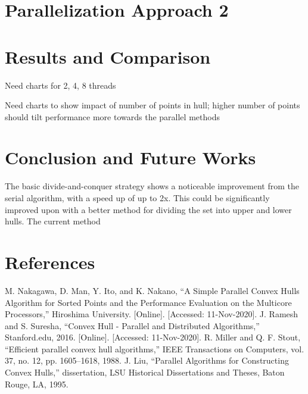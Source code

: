 \documentclass[conference]{IEEEtran}
\begin{document}
\section{Parallelization Approach 2}

\section{Results and Comparison}

Need charts for 2, 4, 8 threads

Need charts to show impact of number of points in hull; higher number of points should tilt performance more towards the parallel methods

\section{Conclusion and Future Works}
The basic divide-and-conquer strategy shows a noticeable improvement from the serial algorithm, with a speed up of up to 2x. This could be significantly improved upon with a better method for dividing the set into upper and lower hulls. The current method 

\section{References}
\begin{thebibliography}{00}
 M. Nakagawa, D. Man, Y. Ito, and K. Nakano, “A Simple Parallel Convex Hulls Algorithm for Sorted Points and the Performance Evaluation on the Multicore Processors,” Hiroshima University. [Online]. [Accessed: 11-Nov-2020].
 J. Ramesh and S. Suresha, “Convex Hull - Parallel and Distributed Algorithms,” Stanford.edu,
2016. [Online]. [Accessed: 11-Nov-2020].
 R. Miller and Q. F. Stout, “Efficient parallel convex hull algorithms,” IEEE Transactions on Computers, vol. 37, no. 12, pp. 1605–1618, 1988.
 J. Liu, “Parallel Algorithms for Constructing Convex Hulls,” dissertation, LSU Historical Dissertations and Theses, Baton Rouge, LA, 1995.
\end{thebibliography}
\end{document}
